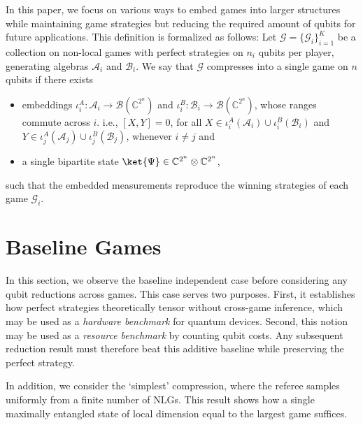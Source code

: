 \documentclass{article}
\begin{document}
    In this paper, we focus on various ways to embed games into larger structures while maintaining game strategies but reducing the required amount of qubits for future applications. This definition is formalized as follows:
        Let $\bm{\mathcal{G}}=\{\mathcal{G}_i\}_{i=1}^K$ be a collection on non-local games with perfect strategies on $n_i$ qubits per player, generating algebras $\mathcal{A}_i$ and $\mathcal{B}_i$. We say that $\bm{\mathcal{G}}$ compresses into a single game on $n$ qubits if there exists
        \begin{itemize}
            \item embeddings $\iota_i^A:\mathcal{A}_i\to \mathcal{B}(\mathbb{C}^{2^n})$ and $\iota_i^B:\mathcal{B}_i\to \mathcal{B}(\mathbb{C}^{2^n})$, whose ranges commute across $i$. i.e., $[X,Y] = 0$, for all   $X \in \iota_i^A(\mathcal{A}_i) \cup \iota_i^B(\mathcal{B}_i)$ and   $Y \in \iota_j^A(\mathcal{A}_j) \cup \iota_j^B(\mathcal{B}_j)$, whenever $i \neq j$ and
            \item a single bipartite state $\ket{\Psi}\in\mathbb{C}^{2^n}\otimes \mathbb{C}^{2^n}$,
        \end{itemize}
        such that the embedded measurements reproduce the winning strategies of each game $\mathcal{G}_i$. 


\section{Baseline Games}\label{sec: warmup}
    In this section, we observe the baseline independent case before considering any qubit reductions across games. This case serves two purposes. First, it establishes how perfect strategies theoretically tensor without cross-game inference, which may be used as a \textit{hardware benchmark} for quantum devices. Second, this notion may be used as a \textit{resource benchmark} by counting qubit costs. Any subsequent reduction result must therefore beat this additive baseline while preserving the perfect strategy.

    In addition, we consider the `simplest' compression, where the referee samples uniformly from a finite number of NLGs. This result shows how a single maximally entangled state of local dimension equal to the largest game suffices. 
\end{document}
